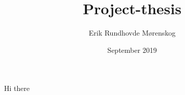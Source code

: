 \documentclass{article}
\title{Project-thesis}
\author{Erik Rundhovde M\o renskog}
\date{September 2019}
\begin{document}
\maketitle

Hi there
\end{document}
